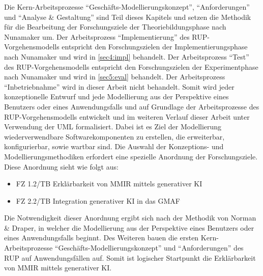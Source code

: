 Die Kern-Arbeitsprozesse \enquote{Geschäfts-Modellierungskonzept}, \enquote{Anforderungen} und \enquote{Analyse \& Gestaltung} sind Teil dieses Kapitels und setzen die Methodik für die Bearbeitung der Forschungsziele der Theoriebildungsphase nach Nunamaker um.
Der Arbeitsprozess \enquote{Implementierung} des RUP-Vorgehensmodells entspricht den Forschungszielen der Implementierungsphase nach Nunamaker und wird in \cref{sec4:impl} behandelt.
Der Arbeitsprozess \enquote{Test} des RUP-Vorgehensmodells entspricht den Forschungszielen der Experimentphase nach Nunamaker und wird in \cref{sec5:eval} behandelt. Der Arbeitsprozess \enquote{Inbetriebnahme} wird in dieser Arbeit nicht behandelt. Somit wird jeder konzeptionelle Entwurf und jede Modellierung aus der Perspektive eines Benutzers oder eines Anwendungsfalls und auf Grundlage der Arbeitsprozesse des RUP-Vorgehensmodells entwickelt und im weiteren Verlauf dieser Arbeit unter Verwendung der UML formalisiert. Dabei
ist es Ziel der Modellierung wiederverwendbare Softwarekomponenten zu erstellen, die erweiterbar, konfigurierbar, sowie wartbar sind. Die Auswahl der Konzeptions- und Modellierungsmethodiken erfordert eine spezielle Anordnung der Forschungsziele. Diese Anordnung sieht wie folgt aus:
\begin{itemize}
    \item FZ 1.2/TB Erklärbarkeit von MMIR mittels generativer KI
    \item FZ 2.2/TB Integration generativer KI in das GMAF
\end{itemize}
Die Notwendigkeit dieser Anordnung ergibt sich nach der Methodik von Norman \& Draper, in welcher die Modellierung aus der Perspektive eines Benutzers oder eines Anwendungsfalls beginnt. Des Weiteren bauen die ersten Kern-Arbeitsprozesse \enquote{Geschäfts-Modellierungskonzept} und \enquote{Anforderungen} des RUP auf Anwendungsfällen auf. Somit ist logischer Startpunkt die Erklärbarkeit von MMIR mittels generativer KI.

\FloatBarrier

